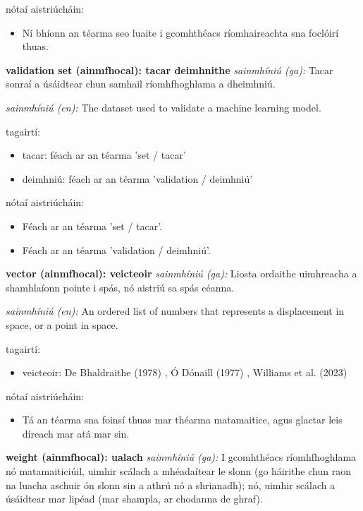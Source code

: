 \documentclass{article}
\begin{document}
nótaí aistriúcháin:
\begin{itemize}
	\item Ní bhíonn an téarma seo luaite i gcomhthéacs ríomhaireachta sna foclóirí thuas.
\end{itemize}


\textbf{validation set (ainmfhocal): tacar deimhnithe}
\textit{sainmhíniú (ga):} Tacar sonraí a úsáidtear chun samhail ríomhfhoghlama a dheimhniú.

\textit{sainmhíniú (en):} The dataset used to validate a machine learning model.

tagairtí:
\begin{itemize}
	\item tacar: féach ar an téarma 'set / tacar'
	\item deimhniú: féach ar an téarma 'validation / deimhniú'
\end{itemize}

nótaí aistriúcháin:
\begin{itemize}
	\item Féach ar an téarma 'set / tacar'.
	\item Féach ar an téarma 'validation / deimhniú'.
\end{itemize}


\textbf{vector (ainmfhocal): veicteoir}
\textit{sainmhíniú (ga):} Liosta ordaithe uimhreacha a shamhlaíonn pointe i spás, nó aistriú sa spás céanna.

\textit{sainmhíniú (en):} An ordered list of numbers that represents a displacement in space, or a point in space.

tagairtí:
\begin{itemize}
	\item veicteoir: De Bhaldraithe (1978) \cite{de-bhaldraithe}, Ó Dónaill (1977) \cite{odonaill}, Williams et al. (2023) \cite{storchiste}
\end{itemize}

nótaí aistriúcháin:
\begin{itemize}
	\item Tá an téarma sna foinsí thuas mar théarma matamaitice, agus glactar leis díreach mar atá mar sin.
\end{itemize}


\textbf{weight (ainmfhocal): ualach}
\textit{sainmhíniú (ga):} I gcomhthéacs ríomhfhoghlama nó matamaiticiúil, uimhir scálach a mhéadaítear le slonn (go háirithe chun raon na luacha aschuir ón slonn sin a athrú nó a shrianadh); nó, uimhir scálach a úsáidtear mar lipéad (mar shampla, ar chodanna de ghraf).
\end{document}
